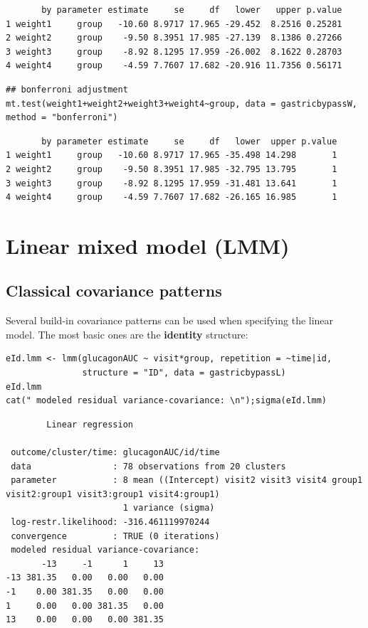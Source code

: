 \documentclass[12pt]{article}
\begin{document}
\begin{verbatim}
       by parameter estimate     se     df   lower   upper p.value
1 weight1     group   -10.60 8.9717 17.965 -29.452  8.2516 0.25281
2 weight2     group    -9.50 8.3951 17.985 -27.139  8.1386 0.27266
3 weight3     group    -8.92 8.1295 17.959 -26.002  8.1622 0.28703
4 weight4     group    -4.59 7.7607 17.682 -20.916 11.7356 0.56171
\end{verbatim}


\lstset{language=r,label= ,caption= ,captionpos=b,numbers=none}
\begin{lstlisting}
## bonferroni adjustment
mt.test(weight1+weight2+weight3+weight4~group, data = gastricbypassW, method = "bonferroni")
\end{lstlisting}

\begin{verbatim}
       by parameter estimate     se     df   lower  upper p.value
1 weight1     group   -10.60 8.9717 17.965 -35.498 14.298       1
2 weight2     group    -9.50 8.3951 17.985 -32.795 13.795       1
3 weight3     group    -8.92 8.1295 17.959 -31.481 13.641       1
4 weight4     group    -4.59 7.7607 17.682 -26.165 16.985       1
\end{verbatim}



\clearpage

\section{Linear mixed model (LMM)}
\label{sec:org8ea2d3b}
\subsection{Classical covariance patterns}
\label{sec:org7209430}

Several build-in covariance patterns can be used when specifying the
linear model. The most basic ones are the \textbf{identity} structure:
\lstset{language=r,label= ,caption= ,captionpos=b,numbers=none}
\begin{lstlisting}
eId.lmm <- lmm(glucagonAUC ~ visit*group, repetition = ~time|id, 
               structure = "ID", data = gastricbypassL)
eId.lmm
cat(" modeled residual variance-covariance: \n");sigma(eId.lmm)
\end{lstlisting}

\begin{verbatim}
		Linear regression 

 outcome/cluster/time: glucagonAUC/id/time 
 data                : 78 observations from 20 clusters 
 parameter           : 8 mean ((Intercept) visit2 visit3 visit4 group1 visit2:group1 visit3:group1 visit4:group1) 
                       1 variance (sigma) 
 log-restr.likelihood: -316.461119970244 
 convergence         : TRUE (0 iterations)
 modeled residual variance-covariance: 
       -13     -1      1     13
-13 381.35   0.00   0.00   0.00
-1    0.00 381.35   0.00   0.00
1     0.00   0.00 381.35   0.00
13    0.00   0.00   0.00 381.35
\end{verbatim}
\end{document}
